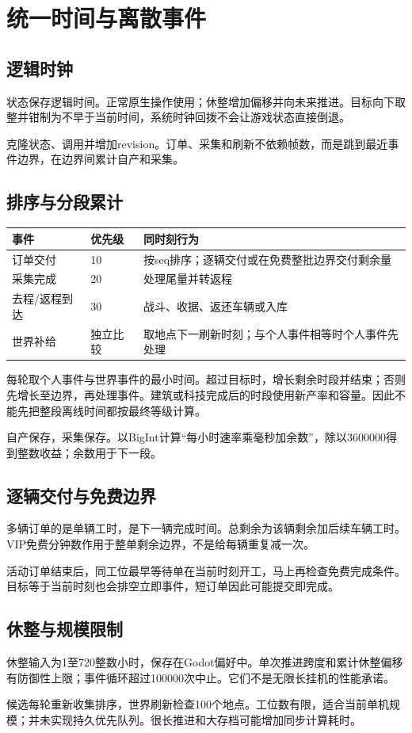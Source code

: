 \chapter{统一时间与离散事件}
\section{逻辑时钟}
状态保存逻辑时间。正常原生操作使用；休整增加偏移并向未来推进。目标向下取整并钳制为不早于当前时间，系统时钟回拨不会让游戏状态直接倒退。

克隆状态、调用并增加revision。订单、采集和刷新不依赖帧数，而是跳到最近事件边界，在边界间累计自产和采集。

\section{排序与分段累计}
\begin{small}\noindent\begin{tabularx}{\linewidth}{@{}P{27mm}P{19mm}Y@{}}
\toprule 事件 & 优先级 & 同时刻行为\\\midrule
订单交付 & 10 & 按seq排序；逐辆交付或在免费整批边界交付剩余量\\
采集完成 & 20 & 处理尾量并转返程\\
去程/返程到达 & 30 & 战斗、收据、返还车辆或入库\\
世界补给 & 独立比较 & 取地点下一刷新时刻；与个人事件相等时个人事件先处理\\\bottomrule
\end{tabularx}\end{small}

每轮取个人事件与世界事件的最小时间。超过目标时，增长剩余时段并结束；否则先增长至边界，再处理事件。建筑或科技完成后的时段使用新产率和容量。因此不能先把整段离线时间都按最终等级计算。

自产保存，采集保存。以BigInt计算“每小时速率乘毫秒加余数”，除以3600000得到整数收益；余数用于下一段。

\section{逐辆交付与免费边界}
多辆订单的是单辆工时，是下一辆完成时间。总剩余为该辆剩余加后续车辆工时。VIP免费分钟数作用于整单剩余边界，不是给每辆重复减一次。

活动订单结束后，同工位最早等待单在当前时刻开工，马上再检查免费完成条件。目标等于当前时刻也会排空立即事件，短订单因此可能提交即完成。

\section{休整与规模限制}
休整输入为1至720整数小时，保存在Godot偏好中。单次推进跨度和累计休整偏移有防御性上限；事件循环超过100000次中止。它们不是无限长挂机的性能承诺。

候选每轮重新收集排序，世界刷新检查100个地点。工位数有限，适合当前单机规模；并未实现持久优先队列。很长推进和大存档可能增加同步计算耗时。
